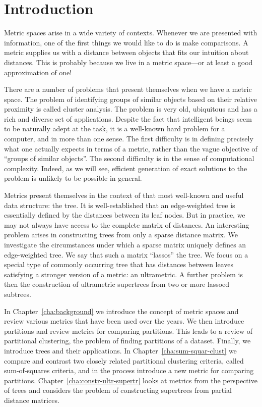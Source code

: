 \chapter{Introduction}
\label{cha:introduction}


Metric spaces arise in a wide variety of contexts.  Whenever we are presented
with information, one of the first things we would like to do is make
comparisons.  A metric supplies us with a distance between objects that fits
our intuition about distances.  This is probably because we live in a metric
space---or at least a good approximation of one!

There are a number of problems that present themselves when we have a metric
space.  The problem of identifying groups of similar objects based on their
relative proximity is called cluster analysis.  The problem is very old,
ubiquitous and has a rich and diverse set of applications.  Despite the fact
that intelligent beings seem to be naturally adept at the task, it is a
well-known hard problem for a computer, and in more than one sense.  The first
difficulty is in defining precisely what one actually expects in terms of a
metric, rather than the vague objective of ``groups of similar objects''.  The
second difficulty is in the sense of computational complexity.  Indeed, as we
will see, efficient generation of exact solutions to the problem is unlikely
to be possible in general.

Metrics present themselves in the context of that most well-known and useful
data structure: the tree.  It is well-established that an edge-weighted tree
is essentially defined by the distances between its leaf nodes.  But in
practice, we may not always have access to the complete matrix of distances.
An interesting problem arises in constructing trees from only a sparse
distance matrix.  We investigate the circumstances under which a sparse matrix
uniquely defines an edge-weighted tree.  We say that such a matrix ``lassos''
the tree.  We focus on a special type of commonly occurring tree that has
distances between leaves satisfying a stronger version of a metric: an
ultrametric.  A further problem is then the construction of ultrametric
supertrees from two or more lassoed subtrees.

In Chapter~\ref{cha:background} we introduce the concept of metric spaces and
review various metrics that have been used over the years.  We then introduce
partitions and review metrics for comparing partitions.  This leads to a
review of partitional clustering, the problem of finding partitions of a
dataset.  Finally, we introduce trees and their applications.  In
Chapter~\ref{cha:sum-squar-clust} we compare and contrast two closely related
partitional clustering criteria, called sum-of-squares criteria, and in the
process introduce a new metric for comparing partitions.
Chapter~\ref{cha:constr-ultr-supertr} looks at metrics from the perspective of
trees and considers the problem of constructing supertrees from partial
distance matrices.



